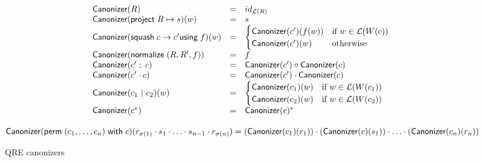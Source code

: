 \documentclass[acmsmall,review,anonymous]{acmart}\settopmatter{printfolios=true,printccs=false,printacmref=false}
\newcommand{\kw}[1]{\ensuremath{\mathsf{#1}}}
\newcommand{\project}[2]{\ensuremath{\kw{project} \; #1 \mapsto #2}}
\newcommand{\squash}[3]{\ensuremath{\kw{squash} \; #1 \rightarrow #2
\kw{using} \; #3}}
\newcommand{\perm}[2]{\ensuremath{\kw{perm}\; (#1)\; \kw{with}\; #2}}
\newcommand{\normalize}[3]{\ensuremath{\kw{normalize} \; (#1, #2, #3)}}
\newcommand{\sep}{\ensuremath{\ | \ }}
\newcommand{\canonizer}{\ensuremath{\kw{Canonizer}}}
\begin{document}
\begin{figure}[t]
\begin{center}
\[
\begin{array}{l@\quad l @\quad l}
\canonizer(R) &=& id_{\mathcal{L}(R)} \\
\canonizer(\project{R}{s})(w) &=& s\\
\canonizer(\squash{c}{c'}{f})(w) &=&
\begin{cases}
\canonizer(c')(f(w)) & \text{if } w \in \mathcal{L}(W(c))\\
\canonizer(c')(w) & \text{otherwise}
\end{cases}\\
\canonizer(\normalize{R}{R'}{f}) &=& f\\
\canonizer(c' \; ; \; c) &=& \canonizer(c') \circ \canonizer(c)\\
\canonizer(c' \cdot c) &=& \canonizer(c') \cdot \canonizer(c)\\
\canonizer(c_1 \sep c_2)(w) &=&
\begin{cases}
\canonizer(c_1)(w) & \text{if } w \in \mathcal{L}(W(c_1))\\
\canonizer(c_2)(w) & \text{if } w \in \mathcal{L}(W(c_2))\\
\end{cases}\\
\canonizer(c^*) &=& \canonizer(c)^* \\
\end{array}
\]
\end{center}
$\canonizer(\perm{c_1, \ldots, c_n}{c})(r_{\sigma(1)}
\cdot s_1 \cdot \ldots \cdot s_{n-1} \cdot r_{\sigma(n)}) \newline
= (\canonizer(c_1)(r_1)) \cdot (\canonizer(c)(s_1)) \cdot \ldots \cdot
(\canonizer(c_n)(r_n))$
\caption{QRE canonizers}
\label{fig:canonizers}
\end{figure}
\end{document}

